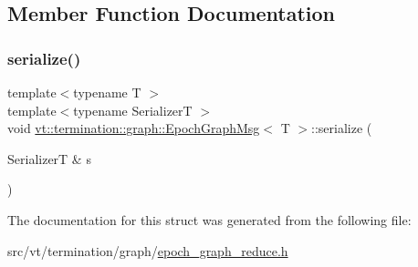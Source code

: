 \subsection{Member Function Documentation}
\mbox{\label{structvt_1_1termination_1_1graph_1_1_epoch_graph_msg_af799d374db4de6b194128e4032e3d412}} 
\subsubsection{\texorpdfstring{serialize()}{serialize()}}
{\footnotesize\ttfamily template$<$typename T $>$ \\
template$<$typename SerializerT $>$ \\
void \hyperlink{structvt_1_1termination_1_1graph_1_1_epoch_graph_msg}{vt\+::termination\+::graph\+::\+Epoch\+Graph\+Msg}$<$ T $>$\+::serialize (\begin{DoxyParamCaption}\item[{SerializerT \&}]{s }\end{DoxyParamCaption})\hspace{0.3cm}{\ttfamily [inline]}}



The documentation for this struct was generated from the following file\+:\begin{DoxyCompactItemize}
\item 
src/vt/termination/graph/\hyperlink{epoch__graph__reduce_8h}{epoch\+\_\+graph\+\_\+reduce.\+h}\end{DoxyCompactItemize}
